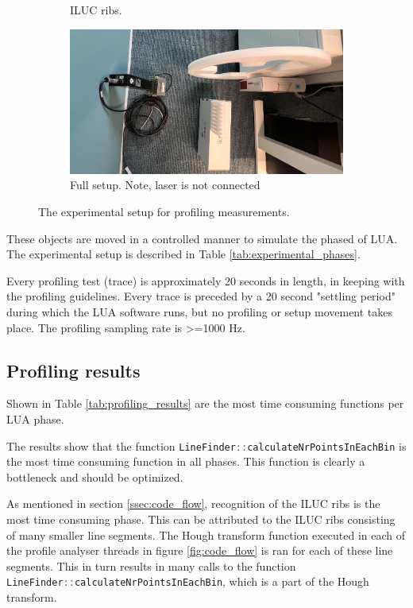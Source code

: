 \begin{figure}[H]
\begin{subfigure}{0.45\textwidth}
        \caption{ILUC ribs.}
    \end{subfigure}
    \centering
    \begin{subfigure}{0.9\textwidth}
        \centering
        \includegraphics[width=\textwidth]{images/test_setup.png}
        \caption{Full setup. Note, laser is not connected}
    \end{subfigure}
    \caption{The experimental setup for profiling measurements.}
\end{figure}


These objects are moved in a controlled manner to simulate the phased of LUA. The experimental setup is described in Table \ref{tab:experimental_phases}.



Every profiling test (trace) is approximately 20 seconds in length, in keeping with the profiling guidelines. Every trace is preceded by a 20 second "settling period" during which the LUA software runs, but no profiling or setup movement takes place. The profiling sampling rate is >=1000 Hz.

\subsection{Profiling results}
Shown in Table \ref{tab:profiling_results} are the most time consuming functions per LUA phase. 



The results show that the function \lstinline[language=c]|LineFinder::calculateNrPointsInEachBin| is the most time consuming function in all phases. This function is clearly a bottleneck and should be optimized. 

As mentioned in section \ref{ssec:code_flow}, recognition of the ILUC ribs is the most time consuming phase. This can be attributed to the ILUC ribs consisting of many smaller line segments. The Hough transform function executed in each of the profile analyser threads in figure
\ref{fig:code_flow} is ran for each of these line segments. This in turn results in many calls to the function \lstinline[language=c]|LineFinder::calculateNrPointsInEachBin|, which is a part of the Hough transform.
